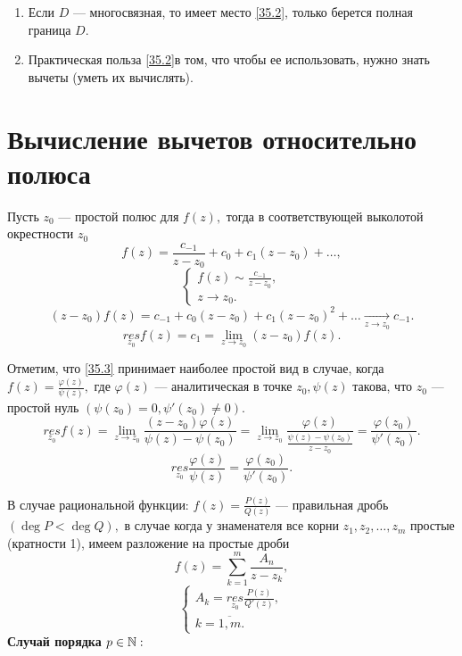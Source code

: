 \documentclass[../../main.tex]{subfiles}
\begin{document}
	\rems
	\begin{enumerate}
		\item Если $D$ --- многосвязная, то имеет место \eqref{35.2}, только берется полная граница $D.$
		\item Практическая польза \eqref{35.2}в том, что чтобы ее использовать, нужно знать вычеты (уметь их вычислять).
	\end{enumerate}
	
	\section{Вычисление вычетов относительно полюса}
	Пусть $z_0$ --- простой полюс для $f(z),$ тогда в соответствующей выколотой окрестности $z_0$
	\[
		f(z) = \frac{c_{-1}}{z-z_0} + c_0 + c_1(z-z_0) + \ldots,
	\]
	\[
		\begin{cases}
		f(z) \sim \frac{c_{-1}}{z - z_0},\\
		z \to z_0.
		\end{cases}
	\]
	\[
		(z-z_0)f(z) = c_{-1} + c_0(z-z_0) + c_1(z-z_0)^2 + \ldots \underset{z \to z_0}{\to} c_{-1}. 	
	\]
	\begin{equation} \label{35.3}
		\underset{z_0}{res} f(z) = c_1 = \lim\limits_{z\to z_0}(z-z_0)f(z).
	\end{equation}
	
	
	Отметим, что \eqref{35.3} принимает наиболее простой вид в случае, когда $f(z) = \frac{\varphi(z)}{\psi(z)},$ где 
	$\varphi(z)$ --- аналитическая в точке $z_0, \psi(z)$ такова, что $z_0$ --- простой нуль $(\psi(z_0) = 0, \psi'(z_0) \ne 0).$
	\[
		\underset{z_0}{res} f(z) = \lim\limits_{z\to z_0}\frac{(z-z_0)\varphi(z)}{\psi(z) - \psi(z_0)} = 
		\lim\limits_{z\to z_0}\frac{\varphi(z)}{\frac{\psi(z) - \psi(z_0)}{z - z_0}} = \frac{\varphi(z_0)}{\psi'(z_0)}.
	\]
	\begin{equation}\label{35.4}
		\underset{z_0}{res} \frac{\varphi(z)}{\psi(z)} = \frac{\varphi(z_0)}{\psi'(z_0)}.
	\end{equation}
	
	В случае рациональной функции: $f(z) = \frac{P(z)}{Q(z)}$ --- правильная дробь $(\deg P < \deg Q),$ в случае когда у знаменателя все корни $z_1, z_2, \ldots, z_m$ простые (кратности 1), имеем разложение на простые дроби 
	\[
		f(z) = \sum_{k=1}^{m}\frac{A_n}{z-z_k},
	\]  
	\[
		\begin{cases}
		A_k = 	\underset{z_0}{res} \frac{P(z)}{Q'(z)}, \\
		k = \overline{1, m}.
		\end{cases}
	\]
	\textbf{Случай порядка $p \in \mathbb{N}:$}
	
\end{document}

